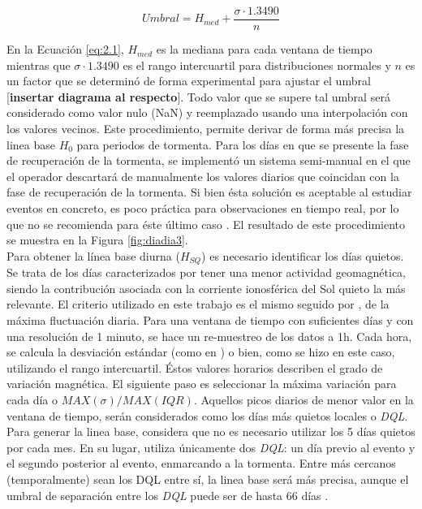 \documentclass[preprint,12pt]{article}
\begin{document}
\begin{equation}
	\label{eq:2.1}
    Umbral = H_{med} + \frac{\sigma \cdot 1.3490}{n}
\end{equation}

En la Ecuación \ref{eq:2.1}, $H_{med}$ es la mediana para cada ventana de tiempo mientras que $\sigma \cdot 1.3490$ es el rango intercuartil para distribuciones normales \cite{iqr_theory} y $n$ es un factor que se determinó de forma experimental para ajustar el umbral [\textbf{insertar diagrama al respecto}]. Todo valor que se supere tal umbral será considerado como valor nulo (NaN) y reemplazado usando una interpolación con los valores vecinos. Este procedimiento, permite derivar de forma más precisa la linea base $H_0$ para periodos de tormenta. Para los días en que se presente la fase de recuperación de la tormenta, se implementó un sistema semi-manual en el que el operador descartará de manualmente los valores diarios que coincidan con la fase de recuperación de la tormenta. Si bien ésta solución es aceptable al estudiar eventos en concreto, es poco práctica para observaciones en tiempo real, por lo que no se recomienda para éste último caso . El resultado de este procedimiento se muestra en la Figura \ref{fig:diadia3}.\\
 

Para obtener la línea base diurna ($H_{SQ}$) es necesario identificar los días quietos. Se trata de los días caracterizados por tener una menor actividad geomagnética, siendo la contribución asociada con la corriente ionosférica del Sol quieto la más relevante. El criterio utilizado en este trabajo es el mismo seguido por \cite{vanKampt}, de la máxima fluctuación diaria. Para una ventana de tiempo con suficientes días y con una resolución de 1 minuto, se hace un re-muestreo de los datos a 1h. Cada hora, se calcula la desviación estándar (como en \cite{vanKampt}) o bien, como se hizo en este caso, utilizando el rango intercuartil. Éstos valores horarios describen el grado de variación magnética. El siguiente paso es seleccionar la máxima variación para cada día o $MAX(\sigma)/MAX(IQR)$. Aquellos picos diarios de menor valor en la ventana de tiempo, serán considerados como los días más quietos locales o \emph{DQL}.\\

Para generar la linea base, \cite{vanKampt} considera que no es necesario utilizar los 5 días quietos por cada mes. En su lugar, \cite{vanKampt} utiliza únicamente dos \emph{DQL}: un día previo al evento y el segundo posterior al evento, enmarcando a la tormenta. Entre más cercanos (temporalmente) sean los DQL entre sí, la linea base será más precisa, aunque el umbral de separación entre los \emph{DQL} puede ser de hasta 66 días \cite{vanKampt}.\\
\end{document}
